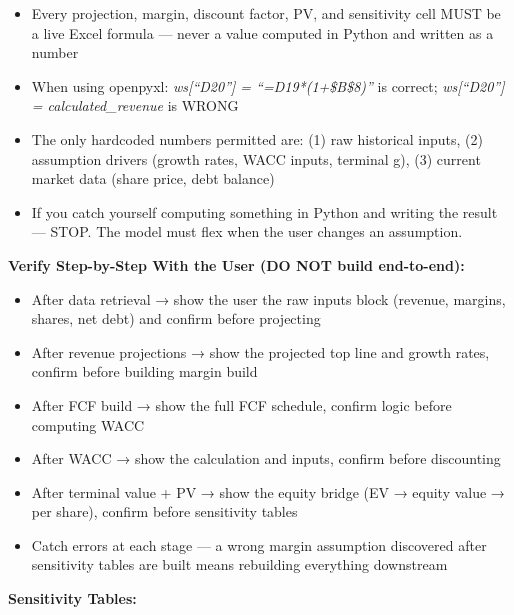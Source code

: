 \documentclass[11pt]{article}
\begin{document}
\begin{itemize}[leftmargin=*,itemsep=2pt,topsep=2pt]
\item {} Every projection, margin, discount factor, PV, and sensitivity cell MUST be a live Excel formula — never a value computed in Python and written as a number
\item {} When using openpyxl: \emph{ws[``D20''] = ``=D19*(1+\$B\$8)''} is correct; \emph{ws[``D20''] = calculated\_\allowbreak{}revenue} is WRONG
\item {} The only hardcoded numbers permitted are: (1) raw historical inputs, (2) assumption drivers (growth rates, WACC inputs, terminal g), (3) current market data (share price, debt balance)
\item {} If you catch yourself computing something in Python and writing the result — STOP. The model must flex when the user changes an assumption.
\end{itemize}

\textbf{Verify Step-by-Step With the User (DO NOT build end-to-end):}

\begin{itemize}[leftmargin=*,itemsep=2pt,topsep=2pt]
\item {} After data retrieval → show the user the raw inputs block (revenue, margins, shares, net debt) and confirm before projecting
\item {} After revenue projections → show the projected top line and growth rates, confirm before building margin build
\item {} After FCF build → show the full FCF schedule, confirm logic before computing WACC
\item {} After WACC → show the calculation and inputs, confirm before discounting
\item {} After terminal value + PV → show the equity bridge (EV → equity value → per share), confirm before sensitivity tables
\item {} Catch errors at each stage — a wrong margin assumption discovered after sensitivity tables are built means rebuilding everything downstream
\end{itemize}

\textbf{Sensitivity Tables:}
\end{document}
